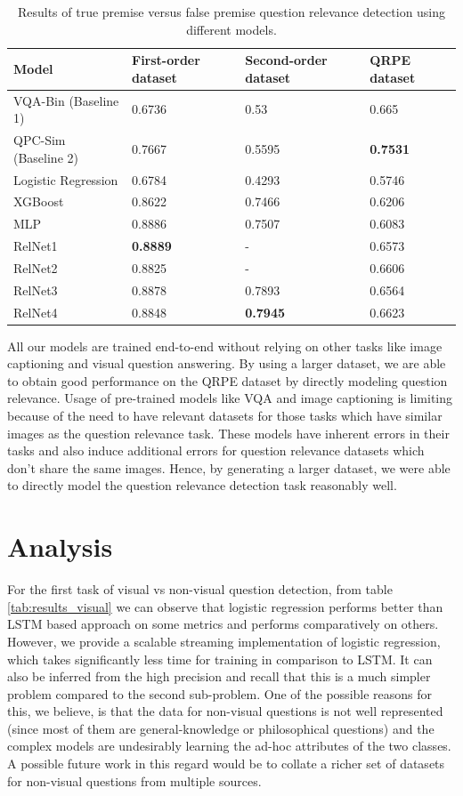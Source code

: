 \begin{table}
  \caption{Results of true premise versus false premise question relevance detection using different models.}
  \label{tab:results_premise}
  \begin{tabularx}{\linewidth}{|l|X|X|X|}
    \toprule
    Model&First-order dataset&Second-order dataset&QRPE dataset\\
    \midrule
    VQA-Bin (Baseline 1)&0.6736&0.53&0.665\\
    QPC-Sim (Baseline 2)&0.7667&0.5595& \textbf{0.7531}\\
    Logistic Regression&0.6784&0.4293&0.5746\\
    XGBoost&0.8622&0.7466&0.6206\\
    MLP&0.8886&0.7507&0.6083\\
    RelNet1& \textbf{0.8889} & - & 0.6573 \\
    RelNet2&0.8825&-&0.6606\\
    RelNet3&0.8878&0.7893&0.6564\\
    RelNet4&0.8848&\textbf{0.7945}&0.6623\\
  \bottomrule
\end{tabularx}
\end{table}

All our models are trained end-to-end without relying on other tasks like image captioning and visual question answering. By using a larger dataset, we are able to obtain good performance on the QRPE dataset by directly modeling question relevance. Usage of pre-trained models like VQA and image captioning is limiting because of the need to have relevant datasets for those tasks which have similar images as the question relevance task. These models have inherent errors in their tasks and also induce additional errors for question relevance datasets which don't share the same images. Hence, by generating a larger dataset, we were able to directly model the question relevance detection task reasonably well. 

\section{Analysis}

For the first task of visual vs non-visual question detection, from table \ref{tab:results_visual} we can observe that logistic regression performs better than LSTM based approach on some metrics and performs comparatively on others. However, we provide a scalable streaming implementation of logistic regression, which takes significantly less time for training in comparison to LSTM. It can also be inferred from the high precision and recall that this is a much simpler problem compared to the second sub-problem. One of the possible reasons for this, we believe, is that the data for non-visual questions is not well represented (since most of them are general-knowledge or philosophical questions) and the complex models are undesirably learning the ad-hoc attributes of the two classes. A possible future work in this regard would be to collate a richer set of datasets for non-visual questions from multiple sources.

